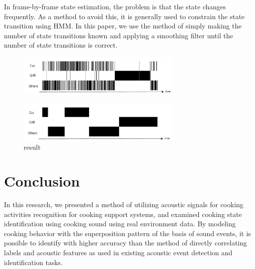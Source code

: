 \documentclass[sigconf,anonymous]{acmart}
\begin{document}
In frame-by-frame state estimation, the problem is that the state changes frequently. As a method to avoid this, it is generally used to constrain the state transition using HMM.
In this paper, we use the method of simply making the number of state transitions known and applying a smoothing filter until the number of state transitions is correct.

\begin{figure}[t]
  \centering
  \includegraphics[width=8cm]{fig/N63_m4.pdf}
  \caption{}
  \Description{}
  \label{baseine_timeline_result}
\end{figure}

\begin{figure}[t]
  \centering
  \includegraphics[width=8cm]{fig/N63_m4_smoothed.pdf}
  \caption{result}
  \Description{}
  \label{baseine_timeline_smoothed_result}
\end{figure}


\section{Conclusion}
In this research, we presented a method of utilizing acoustic signals for cooking activities recognition for cooking support systems, and examined cooking state identification using cooking sound using real environment data.
By modeling cooking behavior with the superposition pattern of the basis of sound events, it is possible to identify with higher accuracy than the method of directly correlating labels and acoustic features as used in existing acoustic event detection and identification tasks.



%



%
\end{document}
